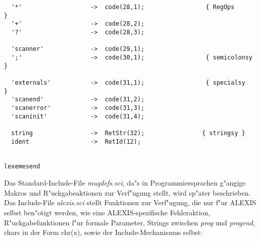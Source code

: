 \begin{verbatim}
  '*'                   ->  code(28,1);                 { RegOps       }
  '+'                   ->  code(28,2);
  '?'                   ->  code(28,3);
 
  'scanner'             ->  code(29,1);
  ';'                   ->  code(30,1);                 { semicolonsy  }
 
  'externals'           ->  code(31,1);                 { specialsy    }
  'scanend'             ->  code(31,2);
  'scanerror'           ->  code(31,3);
  'scaninit'            ->  code(31,4);
 
  string                ->  RetStr(32);                { stringsy }
  ident                 ->  RetId(12);
 
 
lexemesend
\end{verbatim}
\vfill \eject
Das Standard-Include-File {\it mugdefs.sci\/}, da"s in Programmiersprachen
g"angige Makros und R"uckgabeaktionen zur Verf"ugung stellt, wird sp"ater
beschrieben. Das Include-File {\it alexis.sci\/} stellt Funktionen zur Verf"ugung, die
nur f"ur ALEXIS selbst ben"otigt werden, wie eine ALEXIS-spezifische Fehleraktion,
R"uckgabefunktionen f"ur formale Parameter, Strings zwischen {\it prog\/} und  
{\it progend\/}, chars in der Form chr(x), sowie der Include-Mechanismus selbst:

